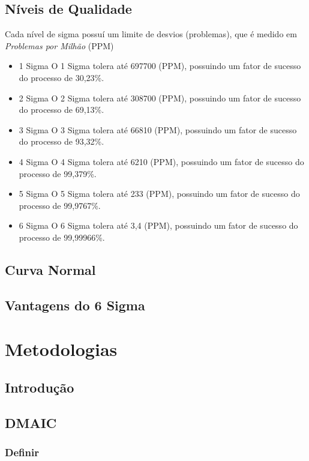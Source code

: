 \documentclass{abnt}
\begin{document}
		\section {Níveis de Qualidade}
		    Cada nível de sigma possuí um limite de desvios (problemas), que é medido em  \textit{Problemas por Milhão} (PPM) 
			\begin{itemize}
			    \item {1 Sigma}
			        \subitem O 1 Sigma tolera até 697700 (PPM), possuindo um fator de sucesso do processo de 30,23\%. 
			    \item {2 Sigma}
			        \subitem O 2 Sigma tolera até 308700 (PPM), possuindo um fator de sucesso do processo de 69,13\%.
			    \item {3 Sigma}
			        \subitem O 3 Sigma tolera até 66810 (PPM), possuindo um fator de sucesso do processo de 93,32\%.
			    \item {4 Sigma}
			        \subitem O 4 Sigma tolera até 6210 (PPM), possuindo um fator de sucesso do processo de 99,379\%.
			    \item {5 Sigma}
			        \subitem O 5 Sigma tolera até 233 (PPM), possuindo um fator de sucesso do processo de 99,9767\%.
			    \item {6 Sigma}
			        \subitem O 6 Sigma tolera até 3,4 (PPM), possuindo um fator de sucesso do processo de 99,99966\%.
			\end{itemize}
		\section {Curva Normal} 
		    
		\section {Vantagens do 6 Sigma}
				
	\chapter {Metodologias}
		\section {Introdução}
			\section {DMAIC}
				\subsection {Definir}
\end{document}
